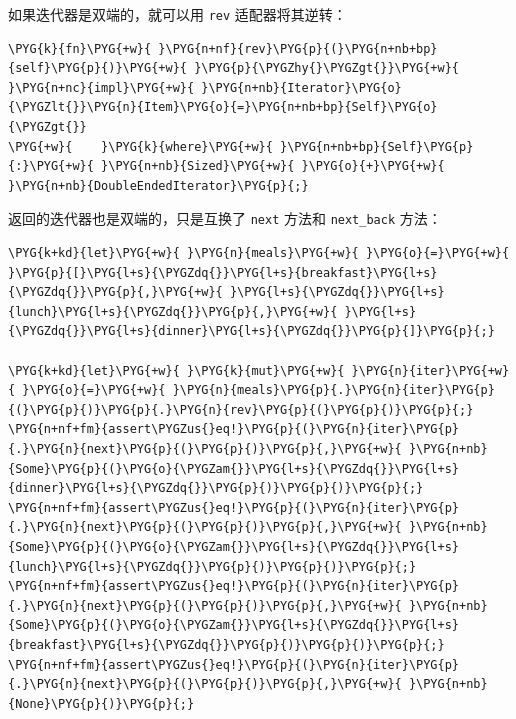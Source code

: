 如果迭代器是双端的，就可以用 \texttt{rev} 适配器将其逆转：

\begin{Verbatim}[commandchars=\\\{\},breaklines=true,breakanywhere=true,fontsize=\codefont,xleftmargin=17bp]
\PYG{k}{fn}\PYG{+w}{ }\PYG{n+nf}{rev}\PYG{p}{(}\PYG{n+nb+bp}{self}\PYG{p}{)}\PYG{+w}{ }\PYG{p}{\PYGZhy{}\PYGZgt{}}\PYG{+w}{ }\PYG{n+nc}{impl}\PYG{+w}{ }\PYG{n+nb}{Iterator}\PYG{o}{\PYGZlt{}}\PYG{n}{Item}\PYG{o}{=}\PYG{n+nb+bp}{Self}\PYG{o}{\PYGZgt{}}
\PYG{+w}{    }\PYG{k}{where}\PYG{+w}{ }\PYG{n+nb+bp}{Self}\PYG{p}{:}\PYG{+w}{ }\PYG{n+nb}{Sized}\PYG{+w}{ }\PYG{o}{+}\PYG{+w}{ }\PYG{n+nb}{DoubleEndedIterator}\PYG{p}{;}
\end{Verbatim}

返回的迭代器也是双端的，只是互换了 \texttt{next} 方法和 \texttt{next\_back} 方法：

\begin{Verbatim}[commandchars=\\\{\},breaklines=true,breakanywhere=true,fontsize=\codefont,xleftmargin=17bp]
\PYG{k+kd}{let}\PYG{+w}{ }\PYG{n}{meals}\PYG{+w}{ }\PYG{o}{=}\PYG{+w}{ }\PYG{p}{[}\PYG{l+s}{\PYGZdq{}}\PYG{l+s}{breakfast}\PYG{l+s}{\PYGZdq{}}\PYG{p}{,}\PYG{+w}{ }\PYG{l+s}{\PYGZdq{}}\PYG{l+s}{lunch}\PYG{l+s}{\PYGZdq{}}\PYG{p}{,}\PYG{+w}{ }\PYG{l+s}{\PYGZdq{}}\PYG{l+s}{dinner}\PYG{l+s}{\PYGZdq{}}\PYG{p}{]}\PYG{p}{;}

\PYG{k+kd}{let}\PYG{+w}{ }\PYG{k}{mut}\PYG{+w}{ }\PYG{n}{iter}\PYG{+w}{ }\PYG{o}{=}\PYG{+w}{ }\PYG{n}{meals}\PYG{p}{.}\PYG{n}{iter}\PYG{p}{(}\PYG{p}{)}\PYG{p}{.}\PYG{n}{rev}\PYG{p}{(}\PYG{p}{)}\PYG{p}{;}
\PYG{n+nf+fm}{assert\PYGZus{}eq!}\PYG{p}{(}\PYG{n}{iter}\PYG{p}{.}\PYG{n}{next}\PYG{p}{(}\PYG{p}{)}\PYG{p}{,}\PYG{+w}{ }\PYG{n+nb}{Some}\PYG{p}{(}\PYG{o}{\PYGZam{}}\PYG{l+s}{\PYGZdq{}}\PYG{l+s}{dinner}\PYG{l+s}{\PYGZdq{}}\PYG{p}{)}\PYG{p}{)}\PYG{p}{;}
\PYG{n+nf+fm}{assert\PYGZus{}eq!}\PYG{p}{(}\PYG{n}{iter}\PYG{p}{.}\PYG{n}{next}\PYG{p}{(}\PYG{p}{)}\PYG{p}{,}\PYG{+w}{ }\PYG{n+nb}{Some}\PYG{p}{(}\PYG{o}{\PYGZam{}}\PYG{l+s}{\PYGZdq{}}\PYG{l+s}{lunch}\PYG{l+s}{\PYGZdq{}}\PYG{p}{)}\PYG{p}{)}\PYG{p}{;}
\PYG{n+nf+fm}{assert\PYGZus{}eq!}\PYG{p}{(}\PYG{n}{iter}\PYG{p}{.}\PYG{n}{next}\PYG{p}{(}\PYG{p}{)}\PYG{p}{,}\PYG{+w}{ }\PYG{n+nb}{Some}\PYG{p}{(}\PYG{o}{\PYGZam{}}\PYG{l+s}{\PYGZdq{}}\PYG{l+s}{breakfast}\PYG{l+s}{\PYGZdq{}}\PYG{p}{)}\PYG{p}{)}\PYG{p}{;}
\PYG{n+nf+fm}{assert\PYGZus{}eq!}\PYG{p}{(}\PYG{n}{iter}\PYG{p}{.}\PYG{n}{next}\PYG{p}{(}\PYG{p}{)}\PYG{p}{,}\PYG{+w}{ }\PYG{n+nb}{None}\PYG{p}{)}\PYG{p}{;}
\end{Verbatim}

